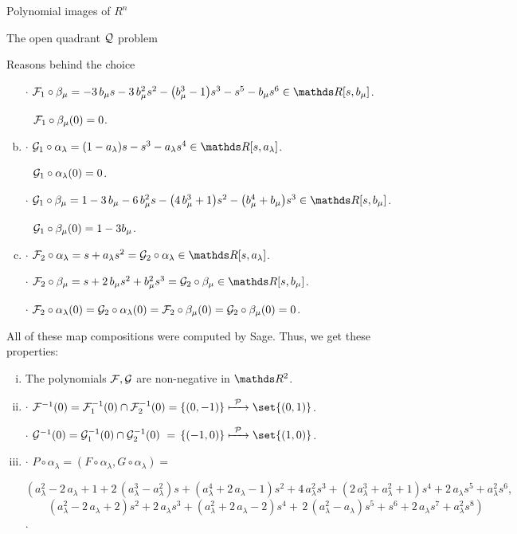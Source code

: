 \documentclass[11pt, a4paper, english, twoside, notitlepage]{report}
\begin{document}
\begin{chapter}{Polynomial images of $R^n$}
\begin{section}{The open quadrant $\mathcal{Q}$ problem}
\begin{subsection}{Reasons behind the choice}
\begin{enumerate}[(a)]
				$\cdot$ $\F_1\circ\beta_{\mu} = -3 \, b_{\mu} s - 3 \, b_{\mu}^{2} s^{2} - {\left(b_{\mu}^{3} - 1\right)} s^{3}-s^{5}-b_{\mu}s^{6} \in\R[s,b_{\mu}]$.
				
				$\ \ \F_1\circ\beta_{\mu}(0)=0$.
				
			\item $\cdot$ $ \G_1\circ\alpha_{\lambda } = {\left(1-a_{\lambda} \right)} s -s^{3} -a_{\lambda} s^{4} \in\R[s,a_{\lambda}]$.
			
				$\ \ \mathcal{G}_1\circ\alpha_{\lambda }(0)=0$.
			
				$\cdot$ $\G_1\circ\beta_{\mu} = 1-3 \, b_{\mu}-6 \, b_{\mu}^{2} s-{\left(4 \, b_{\mu}^{3} + 1\right)} s^{2}-{\left(b_{\mu}^{4} + b_{\mu}\right)} s^{3} \in\R[s,b_{\mu}]$.
				
				 $\ \ \G_1\circ\beta_{\mu}(0)=1-3b_{\mu}$.
		
			\item $\cdot$ $\F_2\circ\alpha_{\lambda }= s+a_{\lambda} s^{2} = \G_2\circ\alpha_{\lambda}\in\R[s,a_{\lambda }]$.
			
				$\cdot$ $\F_2\circ\beta_{\mu}= s+2 \, b_{\mu} s^{2}+b_{\mu}^{2} s^{3} = \G_2\circ\beta_{\mu}\in\R[s,b_{\mu}]$.
				
				$\cdot$ $\mathcal{F}_2\circ\alpha_{\lambda }(0)=\mathcal{G}_2\circ\alpha_{\lambda}(0)=\mathcal{F}_2\circ\beta_{\mu}(0)=\mathcal{G}_2\circ\beta_{\mu}(0)=0$.
		
		\end{enumerate}
		
		All of these map compositions were computed by Sage. Thus, we get these properties:
		
		\begin{enumerate}[(i)]
		
			\item The polynomials $\mathcal{F}, \mathcal{G}$ are non-negative in $\R^2$.
		
			\item $\cdot$ $\F^{-1}(0)=\F_1^{-1}(0)\cap \F_2^{-1}(0)= \{(0,-1)\} \xmapsto{\ \P\ } \set{(0,1)}$.
			
				 $\cdot$ $\G^{-1}(0)=\G_1^{-1}(0)\cap \G_2^{-1}(0)\ =\, \{(-1,0)\} \xmapsto{\ \P\ } \set{(1,0)}$.
		
			\item $\cdot$ $P\circ\alpha_{\lambda}=(F\circ\alpha_{\lambda },G\circ\alpha_{\lambda})=$
			
					$\left(\right.a_{\lambda}^{2}-2 \, a_{\lambda}+1+2 \, {(a_{\lambda}^{3} - a_{\lambda}^{2})} s+{(a_{\lambda}^{4} + 2 \, a_{\lambda} - 1)} s^{2}+4 \, a_{\lambda}^{2} s^{3}+{(2 \, a_{\lambda}^{3} + a_{\lambda}^{2} + 1)} s^{4}+2 \, a_{\lambda} s^{5}+a_{\lambda}^{2} s^{6},$				
					$\qquad  {(a_{\lambda}^{2} - 2 \, a_{\lambda} + 2)} s^{2}+2 \, a_{\lambda} s^{3}+{(a_{\lambda}^{2} + 2 \, a_{\lambda} - 2)} s^{4}+\, 2 \, {(a_{\lambda}^{2} - a_{\lambda})} s^{5}+s^{6}+2 \, a_{\lambda} s^{7}+a_{\lambda}^{2} s^{8}\left.\right)$.
			

\end{enumerate}
\end{subsection}
\end{section}
\end{chapter}
\end{document}
